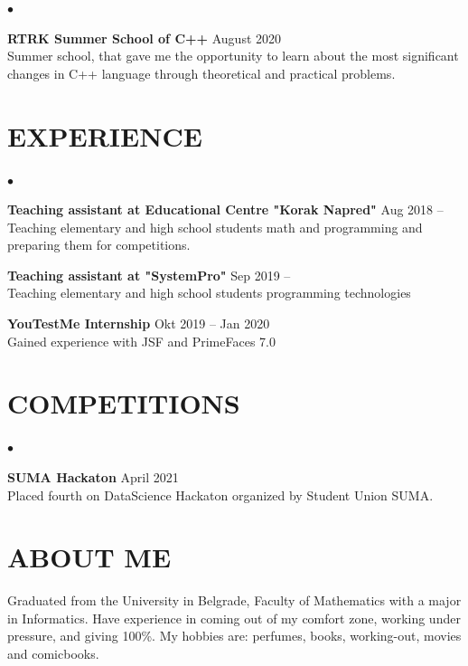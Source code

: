 \documentclass[margin,center]{res}
\newenvironment{list2}{
  \begin{list}{$\bullet$}{%
      \setlength{\itemsep}{0in}
      \setlength{\parsep}{0in} \setlength{\parskip}{0in}
      \setlength{\topsep}{0in} \setlength{\partopsep}{0in}
      \setlength{\leftmargin}{0.2in}}}{\end{list}}
\begin{document}
\begin{resume}
\begin{list2}
  \item {\bf RTRK Summer School of C++} \hfill August 2020\\
    Summer school, that gave me the opportunity to learn about the
    most significant changes in C++ language through theoretical and
    practical problems.

\end{list2}


\section{EXPERIENCE} 
\begin{list2}
  \item{\bf Teaching assistant at Educational Centre "Korak Napred"}  \hfill Aug 2018 --\\
    Teaching elementary and high school students math and programming and preparing them for competitions.
  \item{\bf Teaching assistant at "SystemPro"}  \hfill Sep 2019 --\\
    Teaching elementary and high school students programming technologies 
  \item{\bf YouTestMe Internship}  \hfill Okt 2019 -- Jan 2020\\
    Gained experience with JSF and PrimeFaces 7.0
\end{list2}

\section{COMPETITIONS}
\begin{list2}
\item{\bf SUMA Hackaton} \hfill April 2021\\
  Placed fourth on DataScience Hackaton organized by Student Union SUMA.
\end{list2}

\section{ABOUT ME}  
Graduated from the University in Belgrade, Faculty of Mathematics with a major in Informatics.
Have experience in coming out of my comfort zone, working under pressure, and giving 100\%.  
My hobbies are: perfumes, books, working-out, movies and comicbooks. 



\end{resume}
\end{document}
